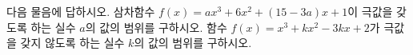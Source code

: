 다음 물음에 답하시오.
 삼차함수 $f(x)=ax^3+6x^2+(15-3a)x+1$이 극값을 갖도록 하는 실수 $a$의 값의 범위를 구하시오.
 함수 $f(x)=x^3+kx^2-3kx+2$가 극값을 갖지 않도록 하는 실수 $k$의 값의 범위를 구하시오.
